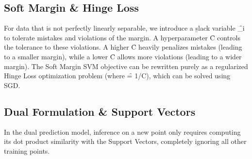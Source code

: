 \subsection{Soft Margin \& Hinge Loss}
For data that is not perfectly linearly separable, we introduce a \b{slack variable} \f{\xi_i } to tolerate mistakes and violations of the margin. A hyperparameter \f{C} controls the tolerance to these violations. A higher \f{C} heavily penalizes mistakes (leading to a smaller margin), while a lower \f{C} allows more violations (leading to a wider margin).
\vspace{.5em}
\vspace{.5em}
The Soft Margin SVM objective can be rewritten purely as a regularized Hinge Loss optimization problem (where \f{\lambda = 1/C}), which can be solved using SGD.





\subsection{Dual Formulation \& Support Vectors}
In the dual prediction model, inference on a new point only requires computing its dot product similarity with the Support Vectors, completely ignoring all other training points.




